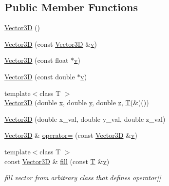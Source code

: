 \subsection*{Public Member Functions}
\begin{DoxyCompactItemize}
\item 
\hyperlink{class_d_d_surfaces_1_1_vector3_d_a73ba737984a707d10941c463359449f5}{Vector3D} ()
\item 
\hyperlink{class_d_d_surfaces_1_1_vector3_d_aca002b4e7f684e42be118701f5f36a24}{Vector3D} (const \hyperlink{class_d_d_surfaces_1_1_vector3_d}{Vector3D} \&\hyperlink{_multi_view_8cpp_a8320ee13ac034dbf6d624fe8953dd337}{v})
\item 
\hyperlink{class_d_d_surfaces_1_1_vector3_d_a66b1e2e00762d97d32977463936965aa}{Vector3D} (const float $\ast$\hyperlink{_multi_view_8cpp_a8320ee13ac034dbf6d624fe8953dd337}{v})
\item 
\hyperlink{class_d_d_surfaces_1_1_vector3_d_a2f148efd6032e40a105962cd7c4aed78}{Vector3D} (const double $\ast$\hyperlink{_multi_view_8cpp_a8320ee13ac034dbf6d624fe8953dd337}{v})
\item 
{\footnotesize template$<$class T $>$ }\\\hyperlink{class_d_d_surfaces_1_1_vector3_d_a46d35b3ac2ae83a3e6e70c650f76522e}{Vector3D} (double \hyperlink{class_d_d_surfaces_1_1_vector3_d_a08e4c3ffc5f8b352a7913bc131b1ffa6}{x}, double \hyperlink{class_d_d_surfaces_1_1_vector3_d_a553ea5b00ce2220e35c9cd6526a89fa6}{y}, double \hyperlink{class_d_d_surfaces_1_1_vector3_d_a12806622b73dbf8875b9a18f9c4bf45f}{z}, \hyperlink{class_t}{T}(\&)())
\item 
\hyperlink{class_d_d_surfaces_1_1_vector3_d_a145fc8c25d65f9f53ee0bc782b0a2e62}{Vector3D} (double x\+\_\+val, double y\+\_\+val, double z\+\_\+val)
\item 
\hyperlink{class_d_d_surfaces_1_1_vector3_d}{Vector3D} \& \hyperlink{class_d_d_surfaces_1_1_vector3_d_a5eeba7fd085f99ab01063a6abbb95db7}{operator=} (const \hyperlink{class_d_d_surfaces_1_1_vector3_d}{Vector3D} \&\hyperlink{_multi_view_8cpp_a8320ee13ac034dbf6d624fe8953dd337}{v})
\item 
{\footnotesize template$<$class T $>$ }\\const \hyperlink{class_d_d_surfaces_1_1_vector3_d}{Vector3D} \& \hyperlink{class_d_d_surfaces_1_1_vector3_d_a978213de77a5f7770167ec87c6798e67}{fill} (const \hyperlink{class_t}{T} \&\hyperlink{_multi_view_8cpp_a8320ee13ac034dbf6d624fe8953dd337}{v})
\begin{DoxyCompactList}\small\item\em fill vector from arbitrary class that defines operator\mbox{[}\mbox{]} \end{DoxyCompactList}\item 

\end{DoxyCompactItemize}
